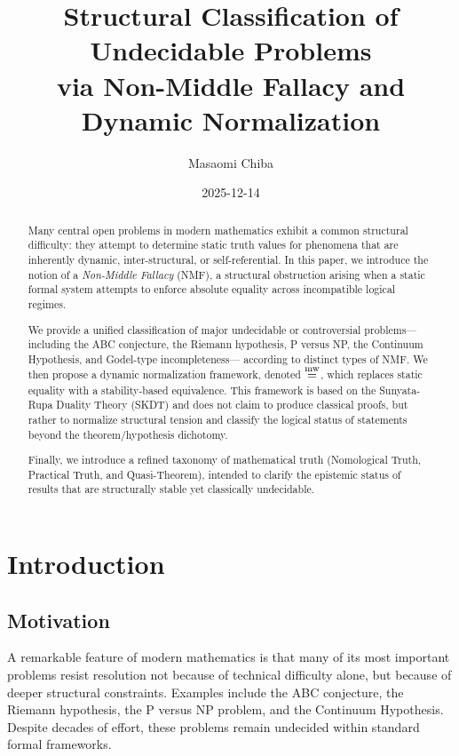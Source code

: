 \documentclass[11pt]{article}
\title{
Structural Classification of Undecidable Problems\\
via Non-Middle Fallacy and Dynamic Normalization
}
\author{
Masaomi Chiba
}
\date{2025-12-14}
\begin{document}
\maketitle

\begin{abstract}
Many central open problems in modern mathematics exhibit a common
structural difficulty: they attempt to determine static truth values
for phenomena that are inherently dynamic, inter-structural, or
self-referential.
In this paper, we introduce the notion of a \emph{Non-Middle Fallacy} (NMF),
a structural obstruction arising when a static formal system attempts
to enforce absolute equality across incompatible logical regimes.

We provide a unified classification of major undecidable or controversial
problems---including the ABC conjecture, the Riemann hypothesis,
P versus NP, the Continuum Hypothesis, and Godel-type incompleteness---
according to distinct types of NMF.
We then propose a dynamic normalization framework, denoted $\mathbf{\mathrel{\overset{\mathrm{mw}}{=}}}$,
which replaces static equality with a stability-based equivalence.
This framework is based on the Sunyata-Rupa Duality Theory (SKDT) and
does not claim to produce classical proofs, but rather
to normalize structural tension and classify the logical status of
statements beyond the theorem/hypothesis dichotomy.

Finally, we introduce a refined taxonomy of mathematical truth
(Nomological Truth, Practical Truth, and Quasi-Theorem),
intended to clarify the epistemic status of results that are
structurally stable yet classically undecidable.
\end{abstract}

\section{Introduction}

\subsection{Motivation}

A remarkable feature of modern mathematics is that many of its most
important problems resist resolution not because of technical
difficulty alone, but because of deeper structural constraints.
Examples include the ABC conjecture, the Riemann hypothesis,
the P versus NP problem, and the Continuum Hypothesis.
Despite decades of effort, these problems remain undecided within
standard formal frameworks.
\end{document}
